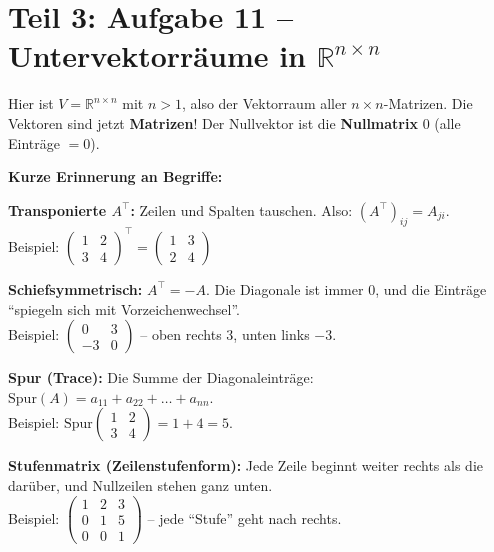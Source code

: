 \documentclass[a4paper,12pt]{article}
\begin{document}
\part*{Teil 3: Aufgabe 11 -- Untervektorr\"aume in $\mathbb{R}^{n \times n}$}

Hier ist $V = \mathbb{R}^{n \times n}$ mit $n > 1$, also der Vektorraum aller $n \times n$-Matrizen. Die Vektoren sind jetzt \textbf{Matrizen}! Der Nullvektor ist die \textbf{Nullmatrix} $0$ (alle Eintr\"age $= 0$).

\textbf{Kurze Erinnerung an Begriffe:}

\begin{merkbox}[title={Wichtige Matrixbegriffe}]
\textbf{Transponierte $A^\top$:} Zeilen und Spalten tauschen. Also: $(A^\top)_{ij} = A_{ji}$.\\
Beispiel: $\begin{pmatrix} 1 & 2 \\ 3 & 4 \end{pmatrix}^\top = \begin{pmatrix} 1 & 3 \\ 2 & 4 \end{pmatrix}$

\medskip
\textbf{Schiefsymmetrisch:} $A^\top = -A$. Die Diagonale ist immer $0$, und die Eintr\"age ``spiegeln sich mit Vorzeichenwechsel''.\\
Beispiel: $\begin{pmatrix} 0 & 3 \\ -3 & 0 \end{pmatrix}$ -- oben rechts $3$, unten links $-3$.

\medskip
\textbf{Spur (Trace):} Die Summe der Diagonaleintr\"age: $\mathrm{Spur}(A) = a_{11} + a_{22} + \ldots + a_{nn}$.\\
Beispiel: $\mathrm{Spur}\begin{pmatrix} 1 & 2 \\ 3 & 4 \end{pmatrix} = 1 + 4 = 5$.

\medskip
\textbf{Stufenmatrix (Zeilenstufenform):} Jede Zeile beginnt weiter rechts als die dar\"uber, und Nullzeilen stehen ganz unten.\\
Beispiel: $\begin{pmatrix} 1 & 2 & 3 \\ 0 & 1 & 5 \\ 0 & 0 & 1 \end{pmatrix}$ -- jede ``Stufe'' geht nach rechts.
\end{merkbox}
\end{document}
